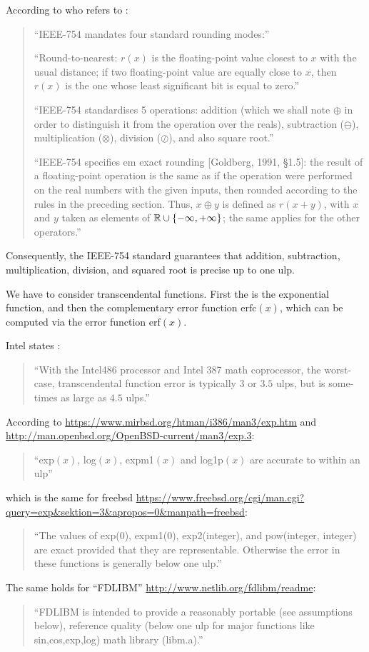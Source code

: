 \documentclass{article}
\begin{document}
According to \citep{Muller:05} who refers to \citep{Goldberg:91}:
\begin{quote}
``IEEE-754 mandates four standard rounding modes:''

``Round-to-nearest: $r(x)$ is the floating-point value closest to $x$ with the
usual distance; if two floating-point value are equally close to $x$, then $r(x)$
is the one whose least significant bit is equal to zero.''

``IEEE-754 standardises 5 operations: addition (which we shall note $\oplus$ in order to
distinguish it from the operation over the reals), subtraction ($\ominus$), multiplication
($\otimes$), division ($\oslash$), and also square root.''

``IEEE-754 specifies {em exact rounding} [Goldberg, 1991, \S1.5]: the result of a
floating-point operation is the same as if the operation were performed on the
real numbers with the given inputs, then rounded according to the rules in the
preceding section. Thus, $x \oplus y$ is defined as $r(x + y)$, with $x$ and $y$ taken as
elements of $\mathbb{R} \cup \{-\infty,+\infty\}$; the same applies for the other operators.''
\end{quote}
Consequently, the IEEE-754 standard guarantees that addition,
subtraction, multiplication, division, and squared root is precise up
to one ulp.

We have to consider transcendental functions. First the is the
exponential function, and then the complementary error
function $\mathrm{erfc}(x)$,
which can be computed via the error function $\mathrm{erf}(x)$.

Intel states \citep{Muller:05}:
\begin{quote}
``With the Intel486 processor and Intel 387 math coprocessor, the worst-
case, transcendental function error is typically $3$ or $3.5$ ulps, but is some-
times as large as $4.5$ ulps.''
\end{quote}


According to \url{https://www.mirbsd.org/htman/i386/man3/exp.htm} and 
\url{http://man.openbsd.org/OpenBSD-current/man3/exp.3}:
\begin{quote}
``exp$(x)$, log$(x)$, expm1$(x)$ and log1p$(x)$ are accurate to within an ulp''
\end{quote}
which is the same for freebsd \url{https://www.freebsd.org/cgi/man.cgi?query=exp&sektion=3&apropos=0&manpath=freebsd}:
\begin{quote}
``The values of exp(0), expm1(0), exp2(integer), and pow(integer, integer)
are exact provided that they are representable.  Otherwise the error in
these functions is generally below one ulp.''
\end{quote}
The same holds for ``FDLIBM'' \url{http://www.netlib.org/fdlibm/readme}:
\begin{quote}
``FDLIBM is intended to provide a reasonably portable (see
assumptions below), reference quality (below one ulp for
major functions like sin,cos,exp,log) math library
(libm.a).''
\end{quote}
\end{document}
